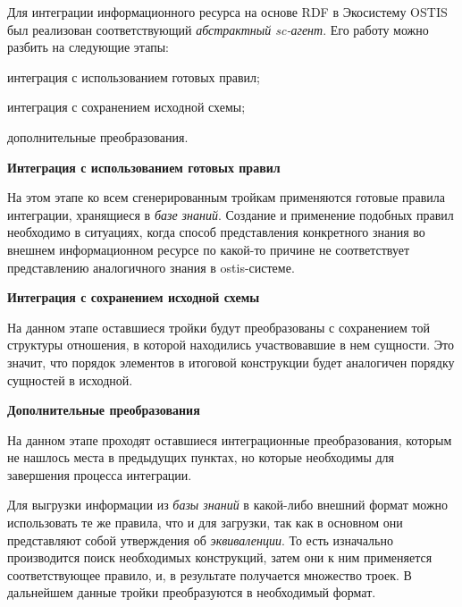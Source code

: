 Для интеграции информационного ресурса на основе RDF в Экосистему OSTIS был реализован соответствующий \textit{абстрактный sc-агент}. Его работу можно разбить на следующие этапы:
\begin{textitemize}
    \item интеграция с использованием готовых правил;
    \item интеграция с сохранением исходной схемы;
    \item дополнительные преобразования.
\end{textitemize}

\textbf{Интеграция с использованием готовых правил}

На этом этапе ко всем сгенерированным тройкам применяются готовые правила интеграции, хранящиеся в \textit{базе знаний}. Создание и применение подобных правил необходимо в ситуациях, когда способ представления конкретного знания во внешнем информационном ресурсе по какой-то причине не соответствует представлению аналогичного знания в ostis-системе.

\textbf{Интеграция с сохранением исходной схемы}

На данном этапе оставшиеся тройки будут преобразованы с сохранением той структуры отношения, в которой находились участвовавшие в нем сущности. Это значит, что порядок элементов в итоговой конструкции будет аналогичен порядку сущностей в исходной.

\textbf{Дополнительные преобразования}

На данном этапе проходят оставшиеся интеграционные преобразования, которым не нашлось места в предыдущих пунктах, но которые необходимы для завершения процесса интеграции.

Для выгрузки информации из \textit{базы знаний} в какой-либо внешний формат можно использовать те же правила, что и для загрузки, так как в основном они представляют собой утверждения об \textit{эквиваленции}. То есть изначально производится поиск необходимых конструкций, затем они к ним применяется соответствующее правило, и, в результате получается множество троек. В дальнейшем данные тройки преобразуются в необходимый формат.